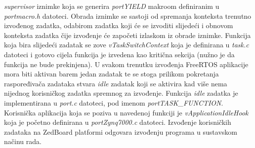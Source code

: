 \documentclass[times, utf8, diplomski, numeric]{fer}
\begin{document}
\textit{supervisor} iznimke koja se generira \textit{portYIELD} makroom definiranim u \textit{portmacro.h} datoteci.
Obrada iznimke se sastoji od spremanja konteksta trenutno izvođenog zadatka, odabirom zadatka koji će se izvoditi slijedeći
i obnovom konteksta zadatka čije izvođenje će započeti izlaskom iz obrade iznimke. Funkcija koja bira slijedeći zadatak
se zove \textit{vTaskSwitchContext} koja je definirana u \textit{task.c} datoteci i gotovo cijela funkcija je izvedena kao
kritična sekcija (nužno je da funkcija ne bude prekinjena). U svakom trenutku izvođenja FreeRTOS aplikacije mora biti aktivan
barem jedan zadatak te se stoga prilikom pokretanja raspoređivača zadataka stvara \textit{idle} zadatak koji se aktivira
kad više nema nijednog korisničkog zadatka spremnog za izvođenje. Funkcija \textit{idle} zadatka je implementirana u
\textit{port.c} datoteci, pod imenom \textit{portTASK\_FUNCTION}. Korisnička aplikacija koja se poziva u navedenoj funkciji
je \textit{vApplicationIdleHook} koja je početno definirana u \textit{portZynq7000.c} datoteci. Izvođenje korisničkih zadataka
na ZedBoard platformi odgovara izvođenju programa u sustavskom načinu rada.
\end{document}
